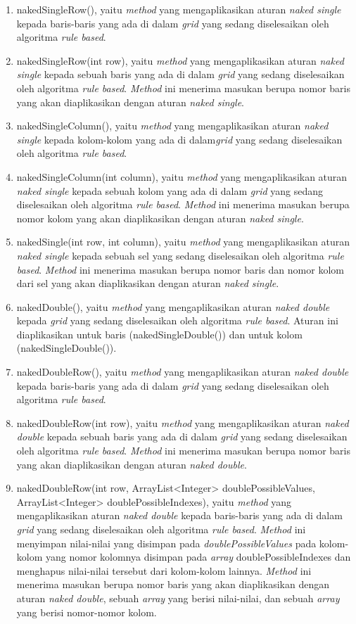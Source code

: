 \begin{enumerate}
\item nakedSingleRow(), yaitu \textit{method} yang mengaplikasikan aturan \textit{naked single} kepada baris-baris yang ada di dalam \textit{grid} yang sedang diselesaikan oleh algoritma \textit{rule based}.
\item nakedSingleRow(int row), yaitu \textit{method} yang mengaplikasikan aturan \textit{naked single} kepada sebuah baris yang ada di dalam \textit{grid} yang sedang diselesaikan oleh algoritma \textit{rule based}. \textit{Method} ini menerima masukan berupa nomor baris yang akan diaplikasikan dengan aturan \textit{naked single}.
\item nakedSingleColumn(), yaitu \textit{method} yang mengaplikasikan aturan \textit{naked single} kepada kolom-kolom yang ada di dalam\textit{grid} yang sedang diselesaikan oleh algoritma \textit{rule based}.
\item nakedSingleColumn(int column), yaitu \textit{method} yang mengaplikasikan aturan \textit{naked single} kepada sebuah kolom yang ada di dalam \textit{grid} yang sedang diselesaikan oleh algoritma \textit{rule based}. \textit{Method} ini menerima masukan berupa nomor kolom yang akan diaplikasikan dengan aturan \textit{naked single}.
\item nakedSingle(int row, int column), yaitu \textit{method} yang mengaplikasikan aturan \textit{naked single} kepada sebuah sel yang sedang diselesaikan oleh algoritma \textit{rule based}. \textit{Method} ini menerima masukan berupa nomor baris dan nomor kolom dari sel yang akan diaplikasikan dengan aturan \textit{naked single}.
\item nakedDouble(), yaitu \textit{method} yang mengaplikasikan aturan \textit{naked double} kepada \textit{grid} yang sedang diselesaikan oleh algoritma \textit{rule based}. Aturan ini diaplikasikan untuk baris (nakedSingleDouble()) dan untuk kolom (nakedSingleDouble()).
\item nakedDoubleRow(), yaitu \textit{method} yang mengaplikasikan aturan \textit{naked double} kepada baris-baris yang ada di dalam \textit{grid} yang sedang diselesaikan oleh algoritma \textit{rule based}.
\item nakedDoubleRow(int row), yaitu \textit{method} yang mengaplikasikan aturan \textit{naked double} kepada sebuah baris yang ada di dalam \textit{grid} yang sedang diselesaikan oleh algoritma \textit{rule based}. \textit{Method} ini menerima masukan berupa nomor baris yang akan diaplikasikan dengan aturan \textit{naked double}.
\item nakedDoubleRow(int row, ArrayList<Integer> doublePossibleValues, ArrayList<Integer> doublePossibleIndexes), yaitu \textit{method} yang mengaplikasikan aturan \textit{naked double} kepada baris-baris yang ada di dalam \textit{grid} yang sedang diselesaikan oleh algoritma \textit{rule based}. \textit{Method} ini menyimpan nilai-nilai yang disimpan pada \textit{doublePossibleValues} pada kolom-kolom yang nomor kolomnya disimpan pada \textit{array} doublePossibleIndexes dan menghapus nilai-nilai tersebut dari kolom-kolom lainnya. \textit{Method} ini menerima masukan berupa nomor baris yang akan diaplikasikan dengan aturan \textit{naked double}, sebuah \textit{array} yang berisi nilai-nilai, dan sebuah \textit{array} yang berisi nomor-nomor kolom.

\end{enumerate}
